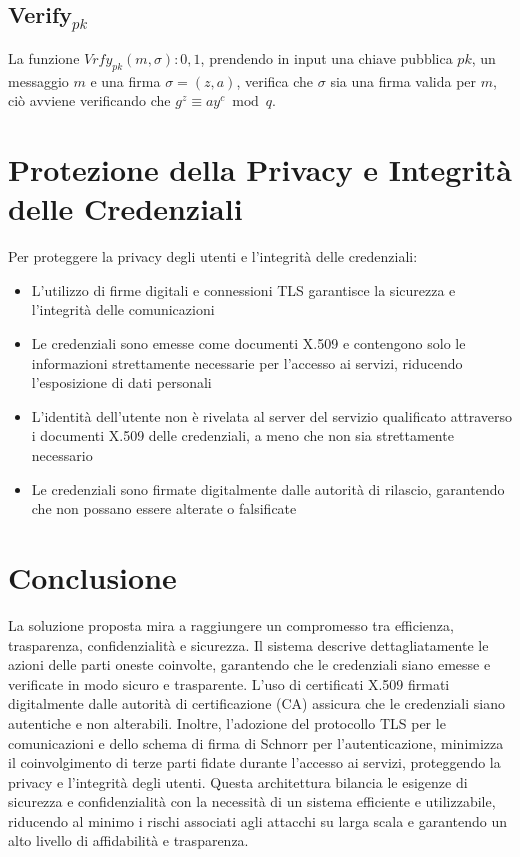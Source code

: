         \subsection{Verify$_{pk}$}
            La funzione $Vrfy_{pk}(m, \sigma) : {0, 1}$, prendendo in input una chiave pubblica $pk$, un messaggio $m$ e una firma $\sigma = (z, a)$, verifica che $\sigma$ sia una firma valida per $m$, ciò avviene verificando che $g^z \equiv ay^c \bmod{q}$.

    
    \section{Protezione della Privacy e Integrità delle Credenziali}
        Per proteggere la privacy degli utenti e l'integrità delle credenziali:
        \begin{itemize}
            \item L'utilizzo di firme digitali e connessioni TLS garantisce la sicurezza e l'integrità delle comunicazioni
            
            \item Le credenziali sono emesse come documenti X.509 e contengono solo le informazioni strettamente necessarie per l'accesso ai servizi, riducendo l'esposizione di dati personali
                
             \item L'identità dell'utente non è rivelata al server del servizio qualificato attraverso i documenti X.509 delle credenziali, a meno che non sia strettamente necessario
                
             \item Le credenziali sono firmate digitalmente dalle autorità di rilascio, garantendo che non possano essere alterate o falsificate
        \end{itemize}
    
    
    \section{Conclusione}
        La soluzione proposta mira a raggiungere un compromesso tra efficienza, trasparenza, confidenzialità e sicurezza.
        Il sistema descrive dettagliatamente le azioni delle parti oneste coinvolte, garantendo che le credenziali siano emesse e verificate in modo sicuro e trasparente.
        L'uso di certificati X.509 firmati digitalmente dalle autorità di certificazione (CA) assicura che le credenziali siano autentiche e non alterabili.
        Inoltre, l'adozione del protocollo TLS per le comunicazioni e dello schema di firma di Schnorr per l'autenticazione, minimizza il coinvolgimento di terze parti fidate durante l'accesso ai servizi, proteggendo la privacy e l'integrità degli utenti.
        Questa architettura bilancia le esigenze di sicurezza e confidenzialità con la necessità di un sistema efficiente e utilizzabile, riducendo al minimo i rischi associati agli attacchi su larga scala e garantendo un alto livello di affidabilità e trasparenza.